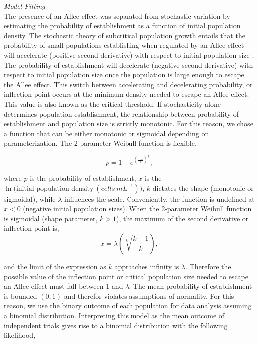 \documentclass[a4paper,10pt]{article}
\begin{document}
\textit{Model Fitting}\\
The presence of an Allee effect was separated from stochastic variation by estimating the probability of establishment as a function of initial population density. The stochastic theory of subcritical population growth entails that the probability of small populations establishing when regulated by an Allee effect will accelerate (positive second derivative) with respect to initial population size \cite{dennis_allee_2002}. The probability of establishment will decelerate (negative second derivative) with respect to initial population size once the population is large enough to escape the Allee effect. This switch between accelerating and decelerating probability, or inflection point occurs at the minimum density needed to escape an Allee effect.  This value is also known as the critical threshold. If stochasticity alone determines population establishment, the relationship between probability of establishment and population size is strictly monotonic.   For this reason, we chose a function that can be either monotonic or sigmoidal depending on parameterization. The 2-parameter Weibull function is flexible,

\begin{equation}
 p = 1-e^{(\frac{-x}{\lambda})^{k}},
\end{equation}

\noindent where $p$ is the probability of establishment, $x$ is the $\ln \text{(initial population density}~(cells~mL^{-1}))$, $k$ dictates the shape (monotonic or sigmoidal), while $\lambda$ influences the scale.  Conveniently, the function is undefined at $x< 0$ (negative initial population sizes). When the 2-parameter Weibull function is sigmoidal (shape parameter, $k>1$), the maximum of the second derivative or inflection point  is,
\begin{equation}
       \tilde x = \lambda \left(\sqrt[k]{\frac{k-1}{k}}\right),
\end{equation}

and the limit of the expression as $k$ approaches infinity is $\lambda$.  Therefore the possible value of the inflection point or critical population size needed to escape an Allee effect must fall between 1 and $\lambda$. The mean probability of establishment is bounded $(0,1)$ and therefor violates assumptions of normality. For this reason, we use the binary outcome of each population for data analysis assuming a binomial distribution. 
Interpreting this model as the mean outcome of independent trials gives rise to a binomial distribution with the following likelihood,
\end{document}
